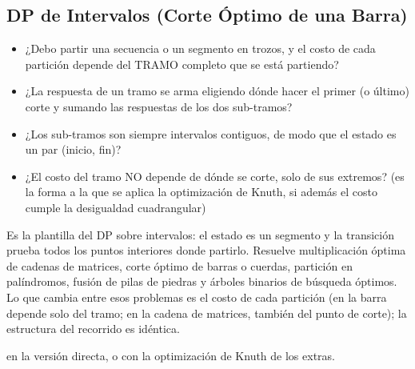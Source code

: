 \subsection{DP de Intervalos (Corte Óptimo de una Barra)}
\label{alg:6-8}


\begin{itemize}
\item ¿Debo partir una secuencia o un segmento en trozos, y el costo de cada partición depende del TRAMO completo que se está partiendo?
\item ¿La respuesta de un tramo se arma eligiendo dónde hacer el primer (o último) corte y sumando las respuestas de los dos sub-tramos?
\item ¿Los sub-tramos son siempre intervalos contiguos, de modo que el estado es un par (inicio, fin)?
\item ¿El costo del tramo NO depende de dónde se corte, solo de sus extremos? (es la forma a la que se aplica la optimización de Knuth, si además el costo cumple la desigualdad cuadrangular)
\end{itemize}

 Es la plantilla del DP sobre intervalos: el estado es un segmento y la transición prueba todos los puntos interiores donde partirlo. Resuelve multiplicación óptima de cadenas de matrices, corte óptimo de barras o cuerdas, partición en palíndromos, fusión de pilas de piedras y árboles binarios de búsqueda óptimos. Lo que cambia entre esos problemas es el costo de cada partición (en la barra depende solo del tramo; en la cadena de matrices, también del punto de corte); la estructura del recorrido es idéntica.

  en la versión directa, o  con la optimización de Knuth de los extras.

